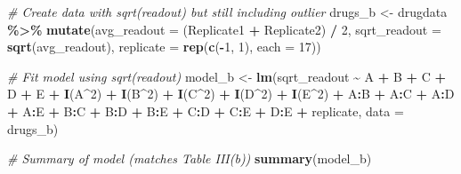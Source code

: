 \documentclass[
]{article}
\newenvironment{Shaded}{\begin{snugshade}}{\end{snugshade}}
\newcommand{\AttributeTok}[1]{\textcolor[rgb]{0.13,0.29,0.53}{#1}}
\newcommand{\CommentTok}[1]{\textcolor[rgb]{0.56,0.35,0.01}{\textit{#1}}}
\newcommand{\DecValTok}[1]{\textcolor[rgb]{0.00,0.00,0.81}{#1}}
\newcommand{\FunctionTok}[1]{\textcolor[rgb]{0.13,0.29,0.53}{\textbf{#1}}}
\newcommand{\NormalTok}[1]{#1}
\newcommand{\OtherTok}[1]{\textcolor[rgb]{0.56,0.35,0.01}{#1}}
\newcommand{\SpecialCharTok}[1]{\textcolor[rgb]{0.81,0.36,0.00}{\textbf{#1}}}
\begin{document}
\begin{Shaded}
\begin{Highlighting}[]
\CommentTok{\# Create data with sqrt(readout) but still including outlier}
\NormalTok{drugs\_b }\OtherTok{\textless{}{-}}\NormalTok{ drugdata }\SpecialCharTok{\%\textgreater{}\%}
  \FunctionTok{mutate}\NormalTok{(}\AttributeTok{avg\_readout =}\NormalTok{ (Replicate1 }\SpecialCharTok{+}\NormalTok{ Replicate2) }\SpecialCharTok{/} \DecValTok{2}\NormalTok{,}
         \AttributeTok{sqrt\_readout =} \FunctionTok{sqrt}\NormalTok{(avg\_readout),}
         \AttributeTok{replicate =} \FunctionTok{rep}\NormalTok{(}\FunctionTok{c}\NormalTok{(}\SpecialCharTok{{-}}\DecValTok{1}\NormalTok{, }\DecValTok{1}\NormalTok{), }\AttributeTok{each =} \DecValTok{17}\NormalTok{))}

\CommentTok{\# Fit model using sqrt(readout)}
\NormalTok{model\_b }\OtherTok{\textless{}{-}} \FunctionTok{lm}\NormalTok{(sqrt\_readout }\SpecialCharTok{\textasciitilde{}}\NormalTok{ A }\SpecialCharTok{+}\NormalTok{ B }\SpecialCharTok{+}\NormalTok{ C }\SpecialCharTok{+}\NormalTok{ D }\SpecialCharTok{+}\NormalTok{ E }\SpecialCharTok{+}
                \FunctionTok{I}\NormalTok{(A}\SpecialCharTok{\^{}}\DecValTok{2}\NormalTok{) }\SpecialCharTok{+} \FunctionTok{I}\NormalTok{(B}\SpecialCharTok{\^{}}\DecValTok{2}\NormalTok{) }\SpecialCharTok{+} \FunctionTok{I}\NormalTok{(C}\SpecialCharTok{\^{}}\DecValTok{2}\NormalTok{) }\SpecialCharTok{+} \FunctionTok{I}\NormalTok{(D}\SpecialCharTok{\^{}}\DecValTok{2}\NormalTok{) }\SpecialCharTok{+} \FunctionTok{I}\NormalTok{(E}\SpecialCharTok{\^{}}\DecValTok{2}\NormalTok{) }\SpecialCharTok{+}
\NormalTok{                A}\SpecialCharTok{:}\NormalTok{B }\SpecialCharTok{+}\NormalTok{ A}\SpecialCharTok{:}\NormalTok{C }\SpecialCharTok{+}\NormalTok{ A}\SpecialCharTok{:}\NormalTok{D }\SpecialCharTok{+}\NormalTok{ A}\SpecialCharTok{:}\NormalTok{E }\SpecialCharTok{+}
\NormalTok{                B}\SpecialCharTok{:}\NormalTok{C }\SpecialCharTok{+}\NormalTok{ B}\SpecialCharTok{:}\NormalTok{D }\SpecialCharTok{+}\NormalTok{ B}\SpecialCharTok{:}\NormalTok{E }\SpecialCharTok{+}
\NormalTok{                C}\SpecialCharTok{:}\NormalTok{D }\SpecialCharTok{+}\NormalTok{ C}\SpecialCharTok{:}\NormalTok{E }\SpecialCharTok{+}\NormalTok{ D}\SpecialCharTok{:}\NormalTok{E }\SpecialCharTok{+}
\NormalTok{                replicate,}
              \AttributeTok{data =}\NormalTok{ drugs\_b)}

\CommentTok{\# Summary of model (matches Table III(b))}
\FunctionTok{summary}\NormalTok{(model\_b)}
\end{Highlighting}
\end{Shaded}
\end{document}
